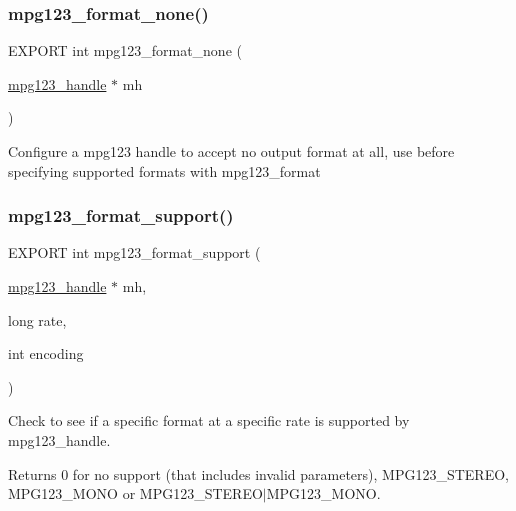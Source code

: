 \subsubsection{\texorpdfstring{mpg123\+\_\+format\+\_\+none()}{mpg123\_format\_none()}}
{\footnotesize\ttfamily E\+X\+P\+O\+RT int mpg123\+\_\+format\+\_\+none (\begin{DoxyParamCaption}\item[{\hyperlink{group__mpg123__init_ga6728e2839a395f3a07d4514da659faca}{mpg123\+\_\+handle} $\ast$}]{mh }\end{DoxyParamCaption})}

Configure a mpg123 handle to accept no output format at all, use before specifying supported formats with mpg123\+\_\+format \mbox{\label{group__mpg123__output_gac7b885ec21c177f9efb1a586ce9fdd20}} 
\subsubsection{\texorpdfstring{mpg123\+\_\+format\+\_\+support()}{mpg123\_format\_support()}}
{\footnotesize\ttfamily E\+X\+P\+O\+RT int mpg123\+\_\+format\+\_\+support (\begin{DoxyParamCaption}\item[{\hyperlink{group__mpg123__init_ga6728e2839a395f3a07d4514da659faca}{mpg123\+\_\+handle} $\ast$}]{mh,  }\item[{long}]{rate,  }\item[{int}]{encoding }\end{DoxyParamCaption})}

Check to see if a specific format at a specific rate is supported by mpg123\+\_\+handle. \begin{DoxyReturn}{Returns}
0 for no support (that includes invalid parameters), M\+P\+G123\+\_\+\+S\+T\+E\+R\+EO, M\+P\+G123\+\_\+\+M\+O\+NO or M\+P\+G123\+\_\+\+S\+T\+E\+R\+E\+O$\vert$\+M\+P\+G123\+\_\+\+M\+O\+NO. 
\end{DoxyReturn}
\mbox{\label{group__mpg123__output_ga47557e1d8d1b31ae4fd49ad4c54458ab}} 
